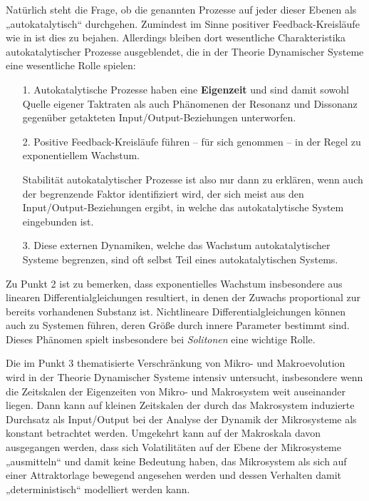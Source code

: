 \documentclass[11pt,a4paper]{article}
\begin{document}
Natürlich steht die Frage, ob die genannten Prozesse auf jeder dieser Ebenen
als „autokatalytisch“ durchgehen. Zumindest im Sinne positiver
Feedback-Kreisläufe wie in \cite{Ulanowicz2009} ist dies zu bejahen.
Allerdings bleiben dort wesentliche Charakteristika autokatalytischer Prozesse
ausgeblendet, die in der Theorie Dynamischer Systeme eine wesentliche Rolle
spielen:
\begin{itemize}[noitemsep]
\item[1.] Autokatalytische Prozesse haben eine \textbf{Eigenzeit} und sind
  damit sowohl Quelle eigener Taktraten als auch Phänomenen der Resonanz und
  Dissonanz gegenüber getakteten Input/Output-Beziehungen unterworfen.
\item[2.] Positive Feedback-Kreisläufe führen -- für sich genommen -- in der
  Regel zu exponentiellem Wachstum.

Stabilität autokatalytischer Prozesse ist also nur dann zu erklären, wenn auch
der begrenzende Faktor identifiziert wird, der sich meist aus den
Input/Output-Beziehungen ergibt, in welche das autokatalytische System
eingebunden ist. 

\item[3.] Diese externen Dynamiken, welche das Wachstum autokatalytischer
  Systeme begrenzen, sind oft selbst Teil eines autokatalytischen Systems.
\end{itemize}
Zu Punkt 2 ist zu bemerken, dass exponentielles Wachstum insbesondere aus
linearen Differentialgleichungen resultiert, in denen der Zuwachs proportional
zur bereits vorhandenen Substanz ist. Nichtlineare Differentialgleichungen
können auch zu Systemen führen, deren Größe durch innere Parameter bestimmt
sind. Dieses Phänomen spielt insbesondere bei \emph{Solitonen} eine wichtige
Rolle.

Die im Punkt 3 thematisierte Verschränkung von Mikro- und Makroevolution wird
in der Theorie Dynamischer Systeme intensiv untersucht, insbesondere wenn die
Zeitskalen der Eigenzeiten von Mikro- und Makrosystem weit auseinander liegen.
Dann kann auf kleinen Zeit\-skalen der durch das Makrosystem induzierte
Durchsatz als Input/Output bei der Analyse der Dynamik der Mikrosysteme als
konstant betrachtet werden.  Umgekehrt kann auf der Makroskala davon
ausgegangen werden, dass sich Volatilitäten auf der Ebene der Mikrosysteme
„ausmitteln“ und damit keine Bedeutung haben, das Mikrosystem als sich auf
einer Attraktorlage bewegend angesehen werden und dessen Verhalten damit
„deterministisch“ modelliert werden kann.
\end{document}

